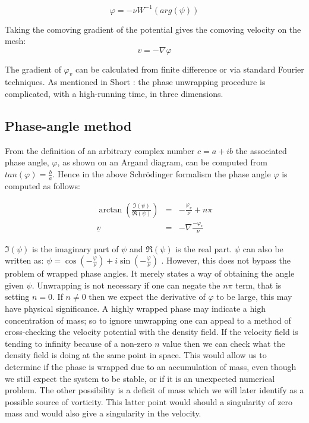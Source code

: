 \begin{equation}
  \varphi = - \nu W^{-1}(arg(\psi))
\end{equation}

\noindent Taking the comoving gradient of the potential gives the comoving velocity on the mesh:
\begin{equation}
  v = - \nabla \varphi
\end{equation}

\noindent The gradient of $\varphi_v$ can be calculated from finite difference or via standard Fourier techniques. As mentioned in Short \citep{bib_short}: the phase unwrapping procedure is complicated, with a high-running time, in three dimensions.


\subsection{Phase-angle method}
From the definition of an arbitrary complex number $c = a+ i b$ the associated phase angle, $\varphi$, as shown on an Argand diagram, can be computed from $tan(\varphi) = \frac{b}{a}$. Hence in the above Schr\"odinger formalism the phase angle $\varphi$ is computed as follows:

\begin{eqnarray}
\arctan\left(\frac{\Im(\psi)}{\Re(\psi)}\right)&=& -\frac{\varphi_{v}}{\nu}  + n \pi \\
\underline{v} &=& -\nabla \frac{-\varphi_v}{\nu}
\end{eqnarray}

\noindent $\Im(\psi)$ is the imaginary part of $\psi$ and $\Re(\psi)$ is the real part. $\psi$ can also be written as: $\psi = \cos(-\frac{\varphi}{\nu}) + i \sin(-\frac{\varphi}{\nu})$ . However, this does not bypass the problem of wrapped phase angles. It merely states a way of obtaining the angle given $\psi$. Unwrapping is not necessary if one can negate the $n \pi$ term, that is setting $n=0$. If $n \neq 0$ then we expect the derivative of $\varphi$ to be large, this may have physical significance. A highly wrapped phase may indicate a high concentration of mass; so to ignore unwrapping one can appeal to a method of cross-checking the velocity potential with the density field. If the velocity field is tending to infinity because of a non-zero $n$ value then we can check what the density field is doing at the same point in space. This would allow us to determine if the phase is wrapped due to an accumulation of mass, even though we still expect the system to be stable, or if it is an unexpected numerical problem. The other possibility is a deficit of mass which we will later identify as a possible source of vorticity. This latter point would should a singularity of zero mass and would also give a singularity in the velocity.

